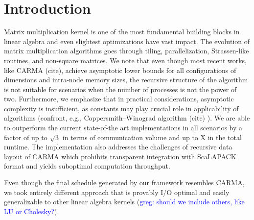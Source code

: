 \documentclass[sigconf]{acmart}
\newcommand\greg[1]{\textcolor{blue}{greg: #1}}
\begin{document}
	
	
	\section{Introduction}
	Matrix multiplication kernel is one of the most fundamental building blocks 
	in linear algebra and even slightest optimizations have vast impact. The 
	evolution of matrix multiplication algorithms goes through tiling, 
	parallelization, Strassen-like routines, and non-square matrices. We note 
	that even though most recent works, like CARMA (cite), achieve asymptotic 
	lower bounds for all configurations of dimensions and intra-node memory 
	sizes, the recursive structure of the algorithm is not suitable for 
	scenarios when the number of processes is not the power of two. 
	Furthermore, we emphasize that in practical considerations, asymptotic 
	complexity is insufficient, as constants may play crucial role in 
	applicability of algorithms (confront, e.g., Coppersmith–Winograd algorithm 
	(cite) ). We are able to outperform the current state-of-the art 
	implementations in all scenarios by a factor of up to $\sqrt{3}$ in terms 
	of communication volume and up to X in the total runtime. The 
	implementation 
	also addresses the challenges of recursive data layout of CARMA which 
	prohibits transparent integration with ScaLAPACK format and yields 
	suboptimal computation throughput.
	
	Even though the final schedule generated by our framework resembles CARMA, 
	we took entirely different approach that is provably I/O optimal and easily 
	generalizable to other linear algebra kernels (\greg{should we include 
	others, like LU or Cholesky?}).
	
\end{document}

